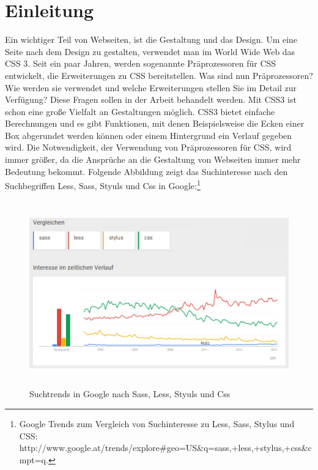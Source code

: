 \section{Einleitung}
\label{section:Introduction}
Ein wichtiger Teil von Webseiten, ist die Gestaltung und das Design. Um eine Seite nach dem Design zu gestalten, verwendet man im World Wide Web das CSS 3. \newline
Seit ein paar Jahren, werden sogenannte Präprozessoren für CSS entwickelt, die Erweiterungen zu CSS bereitstellen.\newline
Was sind nun Präprozessoren? Wie werden sie verwendet und welche Erweiterungen stellen Sie im Detail zur Verfügung?
Diese Fragen sollen in der Arbeit behandelt werden.\newline
Mit CSS3 ist schon eine große Vielfalt an Gestaltungen möglich. CSS3 bietet einfache Berechnungen und es gibt Funktionen, mit denen Beispielsweise die Ecken einer Box abgerundet werden können oder einem Hintergrund ein Verlauf gegeben wird.
Die Notwendigkeit, der Verwendung von Präprozessoren für CSS, wird immer größer, da die Ansprüche an die Gestaltung von Webseiten immer mehr Bedeutung bekommt. Folgende Abbildung zeigt das Suchinteresse nach den Suchbegriffen Less, Sass, Styuls und Css in Google:\footnote[1]{Google Trends zum Vergleich von Suchinteresse zu Less, Sass, Stylus und CSS:  http://www.google.at/trends/explore\#geo=US\&q=sass,+less,+stylus,+css\&cmpt=q.}\newline
\begin{figure}[h]
	\centering
	\includegraphics[height=8.0cm]{images/GoogleTrends_less_vs_sass_vs_stylus_vs_css.jpg}
	\caption{
		Suchtrends in Google nach Sass, Less, Styuls und Css
	}
	\label{figure:Trends Google}
\end{figure}
